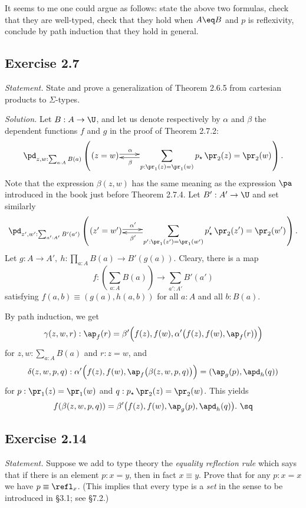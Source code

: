 \documentclass[12pt]{article}
\begin{document}
It seems to me one could argue as follows: state the above two formulas, check that they are well-typed, check that they hold when $A\eq B$ and $p$ is reflexivity, conclude by path induction that they hold in general.


\subsection{Exercise 2.7}

\emph{Statement.} State and prove a generalization of Theorem 2.6.5 from cartesian products to $\Sigma$-types. 

\nn\emph{Solution.} Let $B:A\to\U$, and let us denote respectively by $\alpha$ and $\beta$ the dependent functions $f$ and $g$ in the proof of Theorem 2.7.2:
$$
\pd_{z,w:\sum_{a:A}B(a)}\left(\xymatrix@1{
(z=w)\ar@<2pt>[r]^(.25)\alpha&\displaystyle\sum_{p:\pr_1(z)=\pr_1(w)}p_\star\,\pr_2(z)=\pr_2(w)\ar@<2pt>[l]^(.75)\beta}\right).
$$ 
Note that the expression $\beta(z,w)$ has the same meaning as the expression $\pa$ introduced in the book just before Theorem 2.7.4. Let $B':A'\to\U$ and set similarly 
$$
\pd_{z',w':\sum_{a':A'}B'(a')}\left(\xymatrix@1{
(z'=w')\ar@<2pt>[r]^(.25){\alpha'}&\displaystyle\sum_{p':\pr_1(z')=\pr_1(w')}p'_\star\,\pr_2(z')=\pr_2(w')\ar@<2pt>[l]^(.75){\beta'}}\right).
$$ 
Let $g:A\to A',\ h:\prod_{a:A}B(a)\to B'(g(a))$. Cleary, there is a map 
$$
f:\left(\sum_{a:A}B(a)\right)\to\sum_{a':A'}B'(a')
$$ 
satisfying $f(a,b)\equiv (g(a),h(a,b))$ for all $a:A$ and all $b:B(a)$. 

By path induction, we get  
$$
\gamma(z,w,r):\ap_f(r)=\beta'\Big(f(z),f(w),\alpha'\big(f(z),f(w),\ap_f(r)\big)\Big)
$$ 
for $z,w:\sum_{a:A}B(a)$ and $r:z=w$, and
$$
\delta(z,w,p,q):\alpha'\Big(f(z),f(w),\ap_f\big(\beta(z,w,p,q)\big)\Big)=(\ap_g(p),\apd_h(q))
$$ 
for $p:\pr_1(z)=\pr_1(w)$ and $q:p_\star\,\pr_2(z)=\pr_2(w)$. This yields 
$$
f(\beta(z,w,p,q))=\beta'\big(f(z),f(w),\ap_g(p),\apd_h(q)\big).\ \sq
$$ 


\subsection{Exercise 2.14}

\emph{Statement.} Suppose we add to type theory the \emph{equality reflection rule} which says that if there is an element $p:x=y$, then in fact $x\equiv y$. Prove that for any $p:x=x$ we have $p\equiv\refl_x$. (This implies that every type is a \emph{set} in the sense to be introduced in \S3.1; see \S7.2.)
\end{document}
